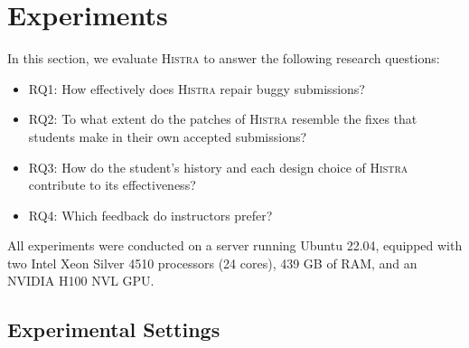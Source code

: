 \documentclass[10pt,conference]{IEEEtran}
\begin{document}
\section{Experiments}\label{sec:experiments}

In this section, we evaluate \textsc{Histra} to answer the following research questions:
\begin{itemize}
  \item RQ1: How effectively does \textsc{Histra} repair buggy submissions?
  \item RQ2: To what extent do the patches of \textsc{Histra} resemble the fixes that students make in their own accepted submissions?
  \item RQ3: How do the student's history and each design choice of \textsc{Histra} contribute to its effectiveness?
  \item RQ4: Which feedback do instructors prefer?
\end{itemize}
All experiments were conducted on a server running Ubuntu 22.04, equipped with two Intel Xeon Silver 4510 processors (24 cores), 439 GB of RAM, and an NVIDIA H100 NVL GPU.

\subsection{Experimental Settings}\label{sec:settings}
\end{document}
